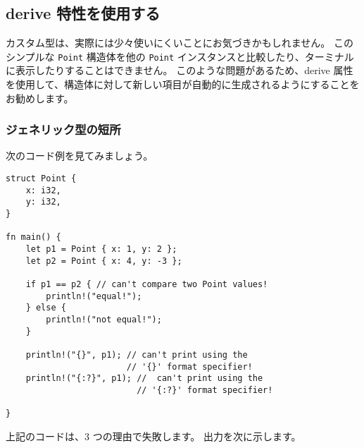 \subsection{derive 特性を使用する}

カスタム型は、実際には少々使いにくいことにお気づきかもしれません。 このシンプルな \texttt{Point} 構造体を他の \texttt{Point} インスタンスと比較したり、ターミナルに表示したりすることはできません。 このような問題があるため、derive 属性を使用して、構造体に対して新しい項目が自動的に生成されるようにすることをお勧めします。

\subsubsection{ジェネリック型の短所}

次のコード例を見てみましょう。


\begin{lstlisting}[numbers=none]
struct Point {
    x: i32,
    y: i32,
}

fn main() {
    let p1 = Point { x: 1, y: 2 };
    let p2 = Point { x: 4, y: -3 };

    if p1 == p2 { // can't compare two Point values!
        println!("equal!");
    } else {
        println!("not equal!");
    }

    println!("{}", p1); // can't print using the
                        // '{}' format specifier!
    println!("{:?}", p1); //  can't print using the
                          // '{:?}' format specifier!

}
\end{lstlisting}

上記のコードは、3 つの理由で失敗します。 出力を次に示します。

